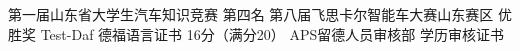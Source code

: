 \documentclass[zh]{resume}
\begin{document}
\begin{entries}
	{第一届山东省大学生汽车知识竞赛 \textbullet 第四名}
	{第八届飞思卡尔智能车大赛山东赛区 \textbullet 优胜奖}
	{Test-Daf 德福语言证书 \textbullet 16分（满分20）}
	{APS留德人员审核部 \textbullet 学历审核证书}
\end{entries}

\clearpage
\end{document}
